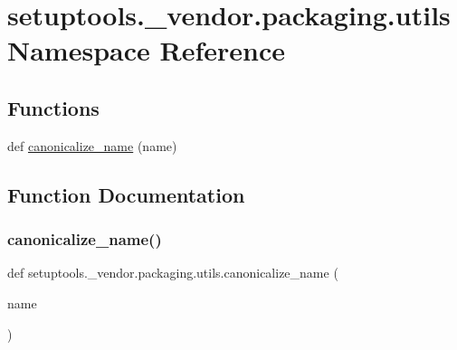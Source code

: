 \hypertarget{namespacesetuptools_1_1__vendor_1_1packaging_1_1utils}{}\section{setuptools.\+\_\+vendor.\+packaging.\+utils Namespace Reference}
\label{namespacesetuptools_1_1__vendor_1_1packaging_1_1utils}
\subsection*{Functions}
\begin{DoxyCompactItemize}
\item 
def \hyperlink{namespacesetuptools_1_1__vendor_1_1packaging_1_1utils_a52e48cb5664a5964cabd98191dc39725}{canonicalize\+\_\+name} (name)
\end{DoxyCompactItemize}


\subsection{Function Documentation}
\mbox{\label{namespacesetuptools_1_1__vendor_1_1packaging_1_1utils_a52e48cb5664a5964cabd98191dc39725}} 
\subsubsection{\texorpdfstring{canonicalize\+\_\+name()}{canonicalize\_name()}}
{\footnotesize\ttfamily def setuptools.\+\_\+vendor.\+packaging.\+utils.\+canonicalize\+\_\+name (\begin{DoxyParamCaption}\item[{}]{name }\end{DoxyParamCaption})}

